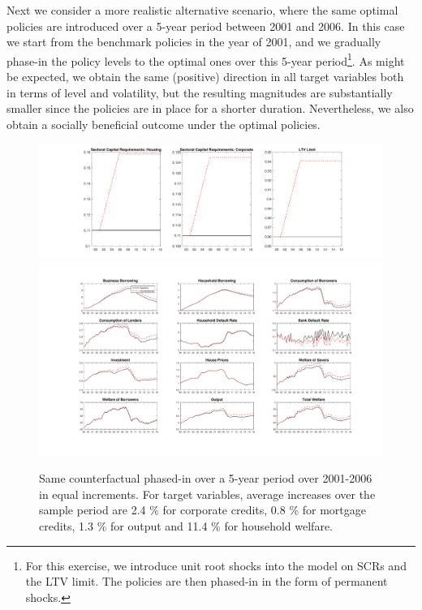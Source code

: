 \documentclass[12pt]{article}
\numberwithin{equation}{section}
\begin{document}
Next we consider a more realistic alternative scenario, where the same optimal policies are introduced over a 5-year period between 2001 and 2006. In this case we start from the benchmark policies in the year of 2001, and we gradually phase-in the policy levels to the optimal ones over this 5-year period\footnote{For this exercise, we introduce unit root shocks into the model on SCRs and the LTV limit. The policies are then phased-in in the form of permanent shocks.}. As might be expected, we obtain the same (positive) direction in all target variables both in terms of level and volatility, but the resulting magnitudes are substantially smaller since the policies are in place for a shorter duration. Nevertheless, we also obtain a socially beneficial outcome under the optimal policies. 

\begin{figure}[H]
\centering
\caption{Same counterfactual phased-in over a 5-year period over 2001-2006 in equal increments. For target variables, average increases  over the sample period are 2.4 \% for corporate credits, 0.8 \% for mortgage credits, 1.3 \% for output and 11.4 \% for household welfare.}
\label{counterfactual2}
\includegraphics[scale=0.35]{CF_policy_rules10.pdf}
\includegraphics[scale=0.4]{main_counterfactual_phaseIn.pdf}\\

\end{figure}
\end{document}
